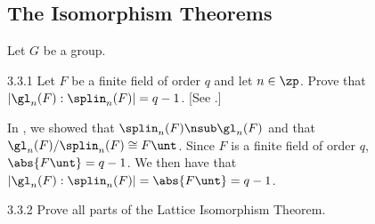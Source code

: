 \subsection{The Isomorphism Theorems}

Let $G$ be a group.

\begin{exercise}{3.3.1}
    Let $F$ be a finite field of order $q$ and let $n \in \zp$.
	Prove that $|\gl_n(F) : \splin_n(F)| = q - 1$. [See .]
\end{exercise}

\begin{sol}
    In , we showed that $\splin_n(F) \nsub \gl_n(F)$ and that $\gl_n(F)/\splin_n(F) \cong F\unt$.
	Since $F$ is a finite field of order $q$, $\abs{F\unt} = q - 1$.
	We then have that $|\gl_n(F) : \splin_n(F)| = \abs{F\unt} = q - 1$.
\end{sol}

\begin{spex}{3.3.2}
    Prove all parts of the Lattice Isomorphism Theorem.
\end{spex}

